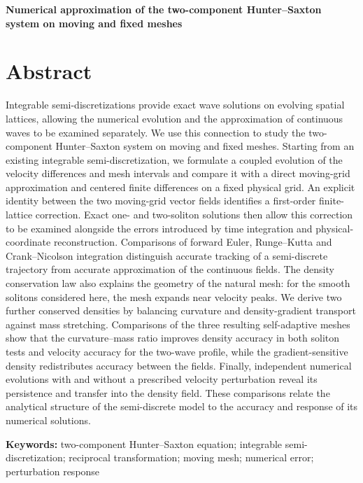 \documentclass[11pt,a4paper]{article}
\begin{document}
{\centering\LARGE\bfseries Numerical approximation of the two-component Hunter–Saxton system on moving and fixed meshes\par}
\vspace{1.2em}
 
\FloatBarrier
\section*{Abstract}

Integrable semi-discretizations provide exact wave solutions on evolving spatial lattices, allowing the numerical evolution and the approximation of continuous waves to be examined separately. We use this connection to study the two-component Hunter–Saxton system on moving and fixed meshes. Starting from an existing integrable semi-discretization, we formulate a coupled evolution of the velocity differences and mesh intervals and compare it with a direct moving-grid approximation and centered finite differences on a fixed physical grid. An explicit identity between the two moving-grid vector fields identifies a first-order finite-lattice correction. Exact one- and two-soliton solutions then allow this correction to be examined alongside the errors introduced by time integration and physical-coordinate reconstruction. Comparisons of forward Euler, Runge–Kutta and Crank–Nicolson integration distinguish accurate tracking of a semi-discrete trajectory from accurate approximation of the continuous fields. The density conservation law also explains the geometry of the natural mesh: for the smooth solitons considered here, the mesh expands near velocity peaks. We derive two further conserved densities by balancing curvature and density-gradient transport against mass stretching. Comparisons of the three resulting self-adaptive meshes show that the curvature--mass ratio improves density accuracy in both soliton tests and velocity accuracy for the two-wave profile, while the gradient-sensitive density redistributes accuracy between the fields. Finally, independent numerical evolutions with and without a prescribed velocity perturbation reveal its persistence and transfer into the density field. These comparisons relate the analytical structure of the semi-discrete model to the accuracy and response of its numerical solutions.

\textbf{Keywords:} two-component Hunter–Saxton equation; integrable semi-discretization; reciprocal transformation; moving mesh; numerical error; perturbation response

\FloatBarrier
\end{document}
